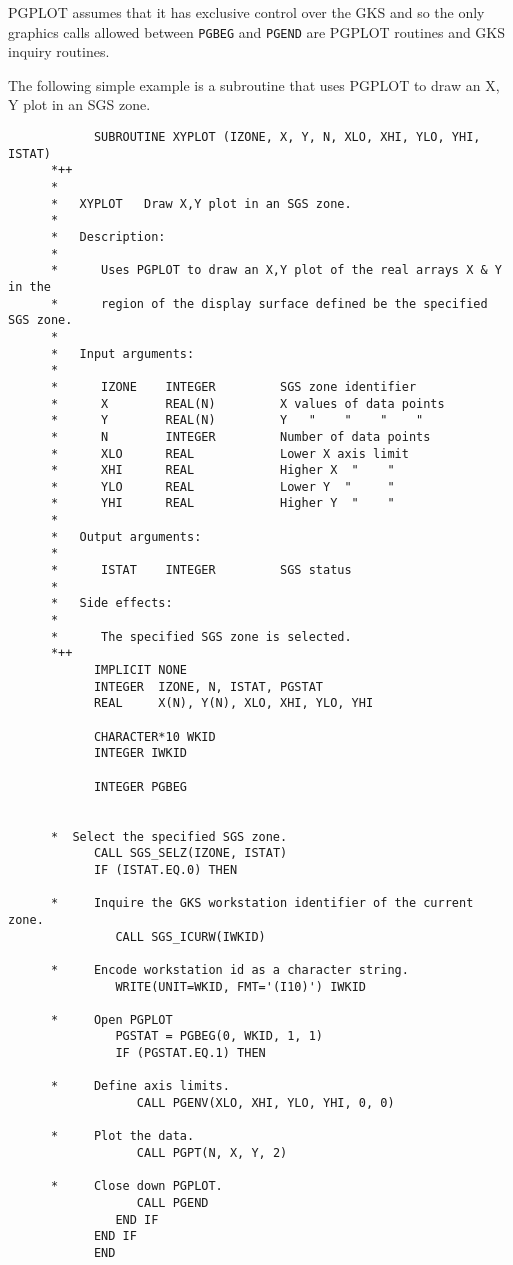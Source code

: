 \documentclass[twoside,11pt]{article}
\renewcommand{\_}{\texttt{\symbol{95}}}
\begin{document}
PGPLOT assumes that it has exclusive control over the GKS and so the only
graphics calls allowed between \texttt{PGBEG} and \texttt{PGEND} are PGPLOT
routines and GKS inquiry routines.

The following simple example is a subroutine that uses PGPLOT to draw an X, Y
plot in an SGS zone.
\begin{small}
\begin{verbatim}
            SUBROUTINE XYPLOT (IZONE, X, Y, N, XLO, XHI, YLO, YHI, ISTAT)
      *++
      *
      *   XYPLOT   Draw X,Y plot in an SGS zone.
      *
      *   Description:
      *
      *      Uses PGPLOT to draw an X,Y plot of the real arrays X & Y in the
      *      region of the display surface defined be the specified SGS zone.
      *
      *   Input arguments:
      *
      *      IZONE    INTEGER         SGS zone identifier
      *      X        REAL(N)         X values of data points
      *      Y        REAL(N)         Y   "    "    "    "
      *      N        INTEGER         Number of data points
      *      XLO      REAL            Lower X axis limit
      *      XHI      REAL            Higher X  "    "
      *      YLO      REAL            Lower Y  "     "
      *      YHI      REAL            Higher Y  "    "
      *
      *   Output arguments:
      *
      *      ISTAT    INTEGER         SGS status
      *
      *   Side effects:
      *
      *      The specified SGS zone is selected.
      *++
            IMPLICIT NONE
            INTEGER  IZONE, N, ISTAT, PGSTAT
            REAL     X(N), Y(N), XLO, XHI, YLO, YHI

            CHARACTER*10 WKID
            INTEGER IWKID

            INTEGER PGBEG


      *  Select the specified SGS zone.
            CALL SGS_SELZ(IZONE, ISTAT)
            IF (ISTAT.EQ.0) THEN

      *     Inquire the GKS workstation identifier of the current zone.
               CALL SGS_ICURW(IWKID)

      *     Encode workstation id as a character string.
               WRITE(UNIT=WKID, FMT='(I10)') IWKID

      *     Open PGPLOT
               PGSTAT = PGBEG(0, WKID, 1, 1)
               IF (PGSTAT.EQ.1) THEN

      *     Define axis limits.
                  CALL PGENV(XLO, XHI, YLO, YHI, 0, 0)

      *     Plot the data.
                  CALL PGPT(N, X, Y, 2)

      *     Close down PGPLOT.
                  CALL PGEND
               END IF
            END IF
            END
\end{verbatim}
\end{small}
\end{document}
